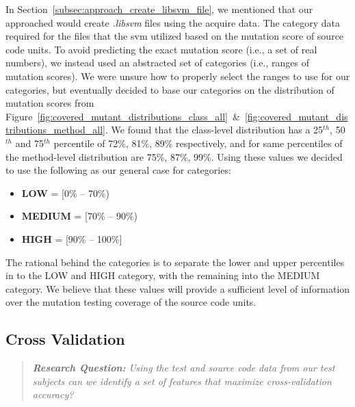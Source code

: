 In Section~\ref{subsec:approach_create_libsvm_file}, we mentioned that our approached would create \emph{.libsvm} files using the acquire data. The category data required for the files that the \gls{svm} utilized based on the mutation score of source code units. To avoid predicting the exact mutation score (i.e., a set of real numbers), we instead used an abstracted set of categories (i.e., ranges of mutation scores). We were unsure how to properly select the ranges to use for our categories, but eventually decided to base our categories on the distribution of mutation scores from Figure~\ref{fig:covered_mutant_distributions_class_all}~\&~\ref{fig:covered_mutant_distributions_method_all}. We found that the class-level distribution has a 25$^{th}$, 50$^{th}$ and 75$^{th}$ percentile of 72\%, 81\%, 89\% respectively, and for same percentiles of the method-level distribution are 75\%, 87\%, 99\%. Using these values we decided to use the following as our general case for categories:

\begin{itemize}
  \item \textbf{LOW} = [0\% -- 70\%)
  \item \textbf{MEDIUM} = [70\% -- 90\%)
  \item \textbf{HIGH} = [90\% -- 100\%]
\end{itemize}

The rational behind the categories is to separate the lower and upper percentiles in to the LOW and HIGH category, with the remaining into the MEDIUM category. We believe that these values will provide a sufficient level of information over the mutation testing coverage of the source code units.


\subsection{Cross Validation}
\label{subsec:experiment_cross_validation}
\begin{quote}
	\emph{\textbf{Research Question:} Using the test and source code data from our test subjects can we identify a set of features that maximize cross-validation accuracy?}
\end{quote}


